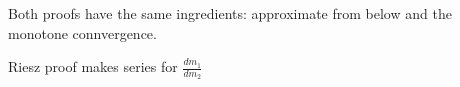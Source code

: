 


\begin{remark}
	Both proofs have the same ingredients: approximate from below and the monotone connvergence.

	Riesz proof makes series for $\frac{d m_1}{d m_2}$
\end{remark}

